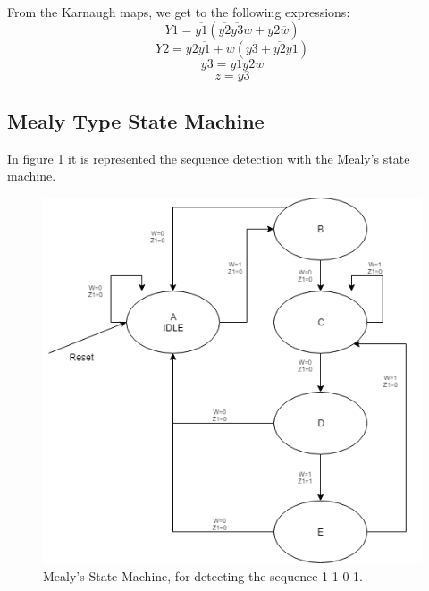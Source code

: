 From the Karnaugh maps, we get to the following expressions:
$$Y1 = \overline{y1} (\overline{y2}   \overline{y3}  w + y2 \overline{w})$$
$$Y2 = y2  \overline{y1} + w (y3 + \overline{y2}  y1)$$
$$y3 = y1  y2  w $$
$$z = y3 $$


\subsection{\color{purple}Mealy Type State Machine}

In figure \ref {MealyEFSM} it is represented the sequence detection with the Mealy's state machine.

\begin{figure}[H]
\centering
\includegraphics[scale=0.5]{../Exercise2/EJ2MEALY}
\caption{\color{cyan}Mealy's State Machine, for detecting the sequence 1-1-0-1.}
\label{MealyEFSM}
\end{figure}

